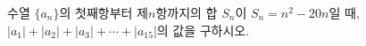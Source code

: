 수열 $\{a_n\}$의 첫째항부터 제$n$항까지의 합 $S_n$이 $S_n=n^2-20n$일 때, $|a_1|+|a_2|+|a_3|+\cdots+|a_{15}|$의 값을 구하시오.

